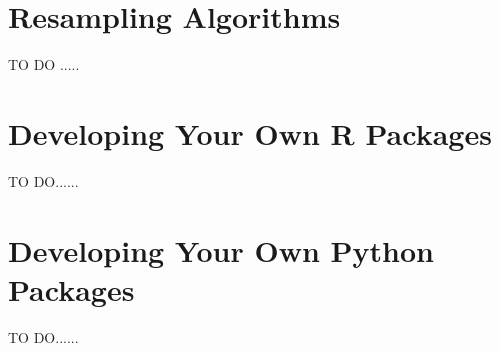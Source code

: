 \documentclass[letterpaper,11pt,english]{sphinxmanual}
\begin{document}
\chapter{Resampling Algorithms}
\label{resample:resample}\label{resample::doc}\label{resample:resampling-algorithms}
TO DO .....


\chapter{Developing Your Own R Packages}
\label{rpkg:rpkg}\label{rpkg::doc}\label{rpkg:developing-your-own-r-packages}
TO DO......


\chapter{Developing Your Own Python Packages}
\label{ppkg:developing-your-own-python-packages}\label{ppkg:ppkg}\label{ppkg::doc}
TO DO......



\renewcommand{\indexname}{Index}
\printindex
\end{document}
